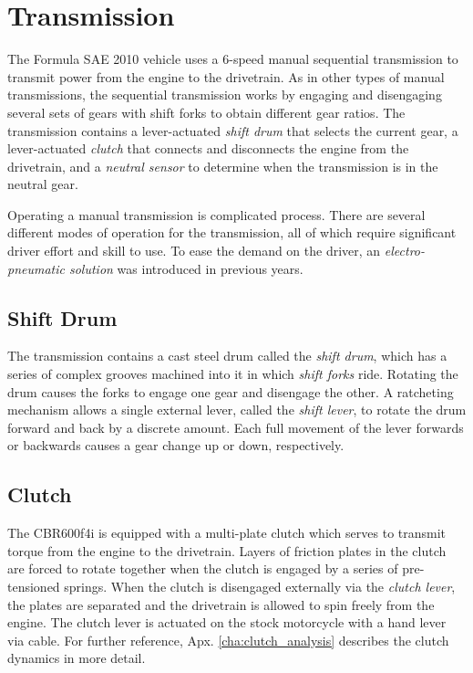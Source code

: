 \section{Transmission\label{sec:background_transmission}}

The Formula SAE 2010 vehicle uses a 6-speed manual sequential transmission to transmit power from the engine to the drivetrain. As in other types of manual transmissions, the sequential transmission works by engaging and disengaging several sets of gears with shift forks to obtain different gear ratios. The transmission contains a lever-actuated \emph{shift drum} that selects the current gear, a lever-actuated \emph{clutch} that connects and disconnects the engine from the drivetrain, and a \emph{neutral sensor} to determine when the transmission is in the neutral gear. 

Operating a manual transmission is complicated process. There are several different modes of operation for the transmission, all of which require significant driver effort and skill to use. To ease the demand on the driver, an \emph{electro-pneumatic solution} was introduced in previous years.

\subsection{Shift Drum}

The transmission contains a cast steel drum called the \emph{shift drum}, which has a series of complex grooves machined into it in which \emph{shift forks} ride. Rotating the drum causes the forks to engage one gear and disengage the other. A ratcheting mechanism allows a single external lever, called the \emph{shift lever}, to rotate the drum forward and back by a discrete amount. Each full movement of the lever forwards or backwards causes a gear change up or down, respectively. 

\subsection{Clutch}

The CBR600f4i is equipped with a multi-plate clutch which serves to transmit torque from the engine to the drivetrain. Layers of friction plates in the clutch are forced to rotate together when the clutch is engaged by a series of pre-tensioned springs. When the clutch is disengaged externally via the \emph{clutch lever}, the plates are separated and the drivetrain is allowed to spin freely from the engine. The clutch lever is actuated on the stock motorcycle with a hand lever via cable. For further reference, Apx. \ref{cha:clutch_analysis} describes the clutch dynamics in more detail.

